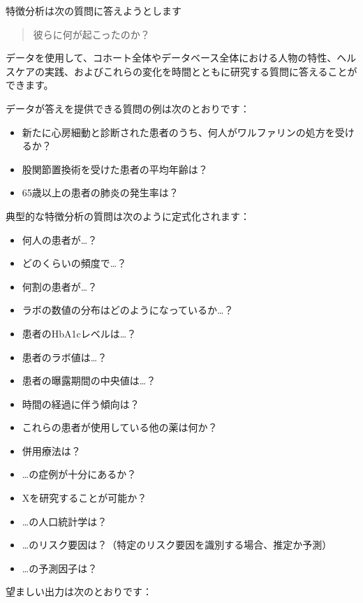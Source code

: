 \documentclass[
  11pt]{book}
\providecommand{\tightlist}{%
  \setlength{\itemsep}{0pt}\setlength{\parskip}{0pt}}
\theoremstyle{definition}
\theoremstyle{definition}
\theoremstyle{definition}
\theoremstyle{definition}
\theoremstyle{remark}
\begin{document}

特徴分析は次の質問に答えようとします

\begin{quote}
彼らに何が起こったのか？
\end{quote}

データを使用して、コホート全体やデータベース全体における人物の特性、ヘルスケアの実践、およびこれらの変化を時間とともに研究する質問に答えることができます。

データが答えを提供できる質問の例は次のとおりです：

\begin{itemize}
\tightlist
\item
  新たに心房細動と診断された患者のうち、何人がワルファリンの処方を受けるか？
\item
  股関節置換術を受けた患者の平均年齢は？
\item
  65歳以上の患者の肺炎の発生率は？
\end{itemize}

典型的な特徴分析の質問は次のように定式化されます：

\begin{itemize}
\tightlist
\item
  何人の患者が\ldots？
\item
  どのくらいの頻度で\ldots？
\item
  何割の患者が\ldots？
\item
  ラボの数値の分布はどのようになっているか\ldots？
\item
  患者のHbA1cレベルは\ldots？
\item
  患者のラボ値は\ldots？
\item
  患者の曝露期間の中央値は\ldots？
\item
  時間の経過に伴う傾向は？
\item
  これらの患者が使用している他の薬は何か？
\item
  併用療法は？
\item
  \ldots の症例が十分にあるか？
\item
  Xを研究することが可能か？
\item
  \ldots の人口統計学は？
\item
  \ldots のリスク要因は？（特定のリスク要因を識別する場合、推定か予測）
\item
  \ldots の予測因子は？
\end{itemize}

望ましい出力は次のとおりです：
\end{document}
